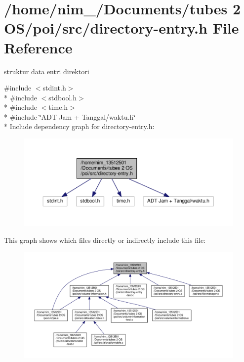 \hypertarget{directory-entry_8h}{\section{/home/nim\-\_/\-Documents/tubes 2 O\-S/poi/src/directory-\/entry.h File Reference}
\label{directory-entry_8h}
}


struktur data entri direktori  


{\ttfamily \#include $<$stdint.\-h$>$}\\*
{\ttfamily \#include $<$stdbool.\-h$>$}\\*
{\ttfamily \#include $<$time.\-h$>$}\\*
{\ttfamily \#include \char`\"{}A\-D\-T Jam + Tanggal/waktu.\-h\char`\"{}}\\*
Include dependency graph for directory-\/entry.h\-:\nopagebreak
\begin{figure}[H]
\begin{center}
\leavevmode
\includegraphics[width=350pt]{directory-entry_8h__incl}
\end{center}
\end{figure}
This graph shows which files directly or indirectly include this file\-:
\nopagebreak
\begin{figure}[H]
\begin{center}
\leavevmode
\includegraphics[width=350pt]{directory-entry_8h__dep__incl}
\end{center}
\end{figure}
